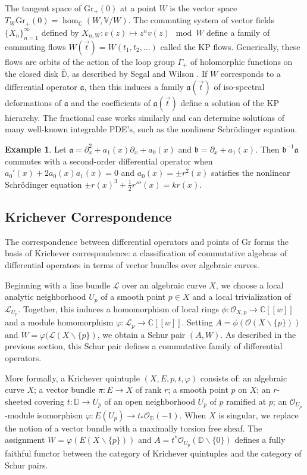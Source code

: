 \documentclass[11pt,letterpaper]{article}
\theoremstyle{definition}
\newtheorem{ex}{Example}
\newcommand{\bbc}{\mathbb{C}}
\newcommand{\bbd}{\mathbb{D}}
\newcommand{\Gr}{\text{Gr}}
\newcommand{\diff}{\backslash}
\newcommand{\ol}[1]{\overline{#1}}
\begin{document}
The tangent space of $\Gr_+(0)$ at a point $W$ is the vector space $T_W\Gr_+(0) = \hom_{\bbc}(W,\mathbb V/W)$.  The commuting system of vector fields $\{X_n\}_{n=1}^\infty$ defined by $X_{n,W}: v(z)\mapsto z^nv(z)\mod W$ define a family of commuting flows $W(\vec t) = W(t_1,t_2,\dots)$ called the KP flows.
Generically, these flows are orbits of the action of the loop group $\Gamma_+$ of holomorphic functions on the closed disk $\ol{\mathbb D}$, as described by Segal and Wilson \cite{SW}.
If $W$ corresponds to a differential operator $\mathfrak a$, then this induces a family $\mathfrak a(\vec t)$ of iso-spectral deformations of $\mathfrak a$ and the coefficients of $\mathfrak a(\vec t)$ define a solution of the KP hierarchy.
The fractional case works similarly and can determine solutions of many well-known integrable PDE's, such as the nonlinear Schr\"odinger equation.
\begin{ex}
	Let $\mathfrak a=\partial_x^2 + a_1(x)\partial_x + a_0(x)$ and $\mathfrak b = \partial_x + a_1(x)$.  Then $\mathfrak b^{-1}\mathfrak a$ commutes with a second-order differential operator when $a_0'(x) + 2a_0(x)a_1(x) =0$ and $a_0(x)=\pm r^2(x)$ satisfies the nonlinear Schr\"odinger equation $\pm r(x)^3 + \frac{1}{2}r'''(x) = kr(x)$.
\end{ex}

\subsection{Krichever Correspondence}
The correspondence between differential operators and points of $\Gr$ forms the basis of Krichever correspondence: a classification of  commutative algebras of differential operators in terms of vector bundles over algebraic curves.

Beginning with a line bundle $\mathcal L$ over an algebraic curve $X$, we choose a local analytic neighborhood $U_p$ of a smooth point $p\in X$ and a local trivialization of $\mathcal L_{U_p}$.  Together, this induces a homomorphism of local rings $\phi: \mathcal O_{X,p}\rightarrow\bbc[[w]]$ and a module homomorphism $\varphi: \mathcal L_p\rightarrow \bbc[[w]]$.
Setting $A = \phi(\mathcal O(X\diff\{p\}))$ and $W = \varphi(\mathcal L(X\diff\{p\})$, we obtain a Schur pair $(A,W)$.  As described in the previous section, this Schur pair defines a commutative family of differential operators.

More formally, a Krichever quintuple $(X,E,p, t,\varphi)$ consists of: an algebraic curve $X$; a vector bundle $\pi: E\rightarrow X$ of rank $r$; a smooth point $p$ on $X$; an $r$-sheeted covering $t:\bbd\rightarrow U_p$ of an open neighborhood $U_p$ of $p$ ramified at $p$; an $\mathcal O_{U_p}$-module isomorphism $\varphi: E(U_p)\rightarrow t_*\mathcal O_{\mathbb D}(-1)$.
When $X$ is singular, we replace the notion of a vector bundle with a maximally torsion free sheaf.
The assignment $W = \varphi(E(X\diff\{p\}))$ and $A = t^*\mathcal O_{U_p}(\mathbb D\diff\{0\})$ defines a fully faithful functor between the category of Krichever quintuples and the category of Schur pairs.
\end{document}
